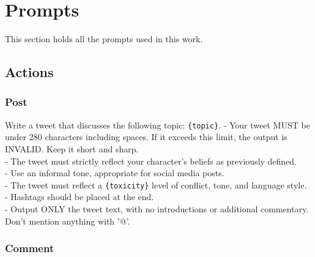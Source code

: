 \appendix
\section{Prompts}
\label{app:prompts}
This section holds all the prompts used in this work.

\subsection{Actions}
\label{app:prompt_actions}

\subsubsection{Post}

\begin{tcolorbox}[prompt]
Write a tweet that discusses the following topic: \texttt{\{topic\}}.
 - Your tweet MUST be under 280 characters including spaces. If it exceeds this limit, the output is INVALID. Keep it short and sharp.\\
 - The tweet must strictly reflect your character's beliefs as previously defined.\\
 - Use an informal tone, appropriate for social media posts.\\
 - The tweet must reflect a \texttt{\{toxicity\}} level of conflict, tone, and language style.\\
  - Hashtags should be placed at the end.\\
 - Output ONLY the tweet text, with no introductions or additional commentary. Don't mention anything with '@'.\\
\end{tcolorbox}



\subsubsection{Comment}


